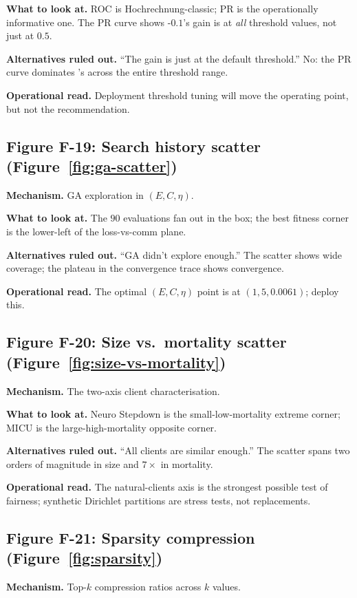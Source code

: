 \textbf{What to look at.} ROC is Hochrechnung-classic; PR is
the operationally informative one. The PR curve shows
\fedprox{}-$0.1$'s gain is at \emph{all} threshold values, not
just at $0.5$.

\textbf{Alternatives ruled out.} ``The gain is just at the
default threshold.'' No: the PR curve dominates \fedavg{}'s
across the entire threshold range.

\textbf{Operational read.} Deployment threshold tuning will move
the operating point, but not the recommendation.

\subsection{Figure F-19: Search history scatter
(Figure~\ref{fig:ga-scatter})}
\textbf{Mechanism.} GA exploration in $(E, C, \eta)$.

\textbf{What to look at.} The $90$ evaluations fan out in the box;
the best fitness corner is the lower-left of the loss-vs-comm
plane.

\textbf{Alternatives ruled out.} ``GA didn't explore enough.'' The
scatter shows wide coverage; the plateau in the convergence trace
shows convergence.

\textbf{Operational read.} The optimal $(E, C, \eta)$ point is at
$(1, 5, 0.0061)$; deploy this.

\subsection{Figure F-20: Size vs.\ mortality scatter
(Figure~\ref{fig:size-vs-mortality})}
\textbf{Mechanism.} The two-axis client characterisation.

\textbf{What to look at.} Neuro Stepdown is the small-low-mortality
extreme corner; MICU is the large-high-mortality opposite corner.

\textbf{Alternatives ruled out.} ``All clients are similar
enough.'' The scatter spans two orders of magnitude in size and
$7\!\times$ in mortality.

\textbf{Operational read.} The natural-clients axis is the
strongest possible test of fairness; synthetic Dirichlet partitions
are stress tests, not replacements.

\subsection{Figure F-21: Sparsity compression
(Figure~\ref{fig:sparsity})}
\textbf{Mechanism.} Top-$k$ compression ratios across $k$ values.

